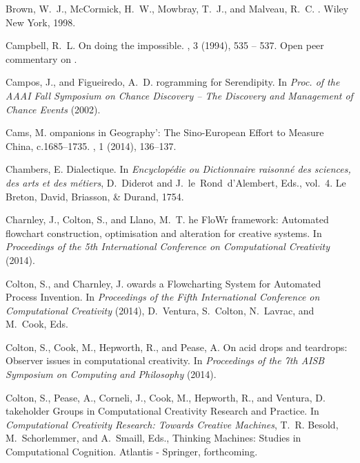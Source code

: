 \begin{thebibliography}{10}
{\sc Brown, W.~J., McCormick, H.~W., Mowbray, T.~J., and Malveau, R.~C.}
.
\newblock Wiley New York, 1998.

{\sc Campbell, R.~L.}
\newblock On doing the impossible.
, 3 (1994), 535 -- 537.
\newblock Open peer commentary on \cite{boden}.

{\sc Campos, J., and Figueiredo, A.~D.}
rogramming for {S}erendipity.
\newblock In {\em Proc. of the AAAI Fall Symposium on Chance Discovery -- The
  Discovery and Management of Chance Events\/} (2002).

{\sc Cams, M.}
ompanions in {G}eography{'}: {T}he {S}ino-{E}uropean {E}ffort
  to {M}easure {C}hina, c.1685--1735.
, 1 (2014), 136--137.

{\sc Chambers, E.}
\newblock Dialectique.
\newblock In {\em Encyclop{\'e}die ou Dictionnaire raisonn{\'e} des sciences,
  des arts et des m{\'e}tiers}, D.~Diderot and J.~le~Rond~d'Alembert, Eds.,
  vol.~4. Le Breton, David, Briasson, \& Durand, 1754.

{\sc Charnley, J., Colton, S., and Llano, M.~T.}
he {F}lo{W}r framework: {A}utomated flowchart construction,
  optimisation and alteration for creative systems.
\newblock In {\em Proceedings of the 5th International Conference on
  Computational Creativity\/} (2014).

{\sc Colton, S., and Charnley, J.}
owards a {F}lowcharting {S}ystem for {A}utomated {P}rocess
  {I}nvention.
\newblock In {\em Proceedings of the Fifth International Conference on
  Computational Creativity\/} (2014), D.~Ventura, S.~Colton, N.~Lavrac, and
  M.~Cook, Eds.

{\sc Colton, S., Cook, M., Hepworth, R., and Pease, A.}
\newblock On acid drops and teardrops: Observer issues in computational
  creativity.
\newblock In {\em Proceedings of the 7th {AISB} {S}ymposium on {C}omputing and
  {P}hilosophy\/} (2014).

{\sc Colton, S., Pease, A., Corneli, J., Cook, M., Hepworth, R., and Ventura,
  D.}
takeholder {G}roups in {C}omputational {C}reativity {R}esearch and
  {P}ractice.
\newblock In {\em Computational Creativity Research: Towards Creative
  Machines}, T.~R. Besold, M.~Schorlemmer, and A.~Smaill, Eds., Thinking
  Machines: Studies in Computational Cognition. Atlantis - Springer,
  forthcoming.


\end{thebibliography}
